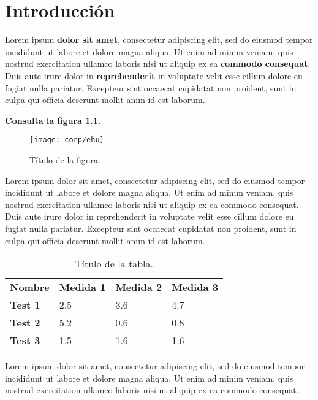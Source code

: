 \chapter{Introducción}

Lorem ipsum \textbf{dolor sit amet}, consectetur adipiscing elit, sed do eiusmod tempor incididunt ut labore et dolore magna aliqua. Ut enim ad minim veniam, quis nostrud exercitation ullamco laboris nisi ut aliquip ex ea \textbf{commodo consequat}. Duis aute irure dolor in \textbf{reprehenderit} in voluptate velit esse cillum dolore eu fugiat nulla pariatur. Excepteur sint occaecat cupidatat non proident, sunt in culpa qui officia deserunt mollit anim id est laborum. 

\textbf{Consulta la figura \ref{fig:devops}.}

\begin{figure}[!ht]
  \centering
  \texttt{[image: corp/ehu]}
  \caption{Título de la figura.}
  \label{fig:devops}
\end{figure}

Lorem ipsum dolor sit amet, consectetur adipiscing elit, sed do eiusmod tempor incididunt ut labore et dolore magna aliqua. Ut enim ad minim veniam, quis nostrud exercitation ullamco laboris nisi ut aliquip ex ea commodo consequat. Duis aute irure dolor in reprehenderit in voluptate velit esse cillum dolore eu fugiat nulla pariatur. Excepteur sint occaecat cupidatat non proident, sunt in culpa qui officia deserunt mollit anim id est laborum.

\begin{table}[h!]
  \centering
  \begin{tabular}{llll}
    \textbf{Nombre} & \textbf{Medida 1} & \textbf{Medida 2} & \textbf{Medida 3} \\
    \textbf{Test 1} & 2.5               & 3.6               & 4.7               \\
    \textbf{Test 2} & 5.2               & 0.6               & 0.8               \\
    \textbf{Test 3} & 1.5               & 1.6               & 1.6              
  \end{tabular}
  \caption{Título de la tabla.}
\end{table}

Lorem ipsum dolor sit amet, consectetur adipiscing elit, sed do eiusmod tempor incididunt ut labore et dolore magna aliqua. Ut enim ad minim veniam, quis nostrud exercitation ullamco laboris nisi ut aliquip ex ea commodo consequat.

